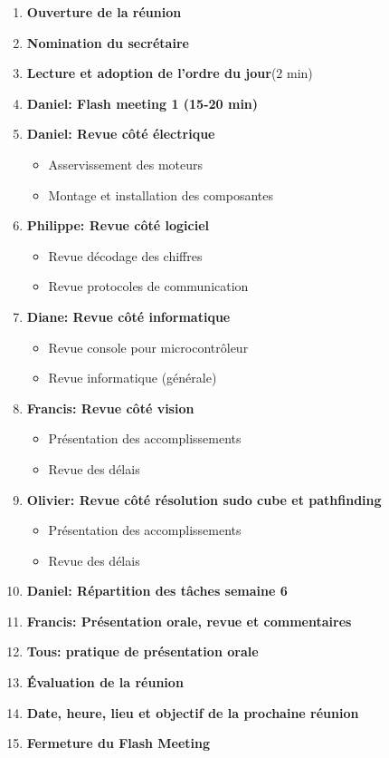 \documentclass[12pt]{ULojpv}
\begin{document}
\entete
\begin{enumerate}
   \item \textbf{Ouverture de la réunion}
   \item \textbf{Nomination du secrétaire}
   \item \textbf{Lecture et adoption de l'ordre du jour}(2 min)
   \item \textbf{Daniel: Flash meeting 1 (15-20 min)} 
   \item \textbf{Daniel: Revue côté électrique}
   \begin{itemize}
   \item Asservissement des moteurs
   \item Montage et installation des composantes
   \end{itemize}
   \item \textbf{Philippe: Revue côté logiciel}
   \begin{itemize}
   \item Revue décodage des chiffres
   \item Revue protocoles de communication
   \end{itemize}
   \item \textbf{Diane: Revue côté informatique}
   \begin{itemize}
   \item Revue console pour microcontrôleur
   \item Revue informatique (générale)
   \end{itemize}
   \item\textbf{Francis: Revue côté vision}
   \begin{itemize}
   \item Présentation des accomplissements
   \item Revue des délais
   \end{itemize}
   \item\textbf{Olivier: Revue côté résolution sudo cube et pathfinding}
   \begin{itemize}
   \item Présentation des accomplissements
   \item Revue des délais
   \end{itemize}
   \item \textbf{Daniel: Répartition des tâches semaine 6}
   \item \textbf{Francis: Présentation orale, revue et commentaires}
   \item \textbf{Tous: pratique de présentation orale}
   \item \textbf{Évaluation de la réunion}
   \item \textbf{Date, heure, lieu et objectif de la prochaine réunion}
   \item \textbf{Fermeture du Flash Meeting}
\end{enumerate}
\end{document}
